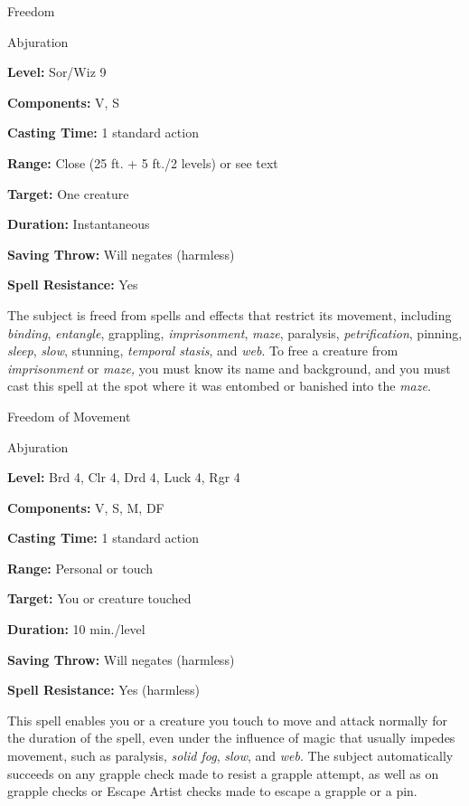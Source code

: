\documentclass{article}
\begin{document}
\vspace{12pt}
Freedom

Abjuration

\textbf{Level:} Sor/Wiz 9

\textbf{Components:} V, S

\textbf{Casting Time:} 1 standard action

\textbf{Range:} Close (25 ft. + 5 ft./2 levels) or see text

\textbf{Target:} One creature

\textbf{Duration:} Instantaneous

\textbf{Saving Throw: }Will negates (harmless)

\textbf{Spell Resistance:} Yes

The subject is freed from spells and effects that restrict its movement, including 
\textit{binding}, \textit{entangle}, grappling, \textit{imprisonment}, \textit{maze}, 
paralysis, \textit{petrification}, pinning, \textit{sleep}, \textit{slow}, stunning, 
\textit{temporal stasis}, and \textit{web}. To free a creature from \textit{imprisonment 
}or \textit{maze, }you must know its name and background, and you must cast this 
spell at the spot where it was entombed or banished into the \textit{maze}.

\vspace{12pt}
Freedom of Movement

Abjuration

\textbf{Level:} Brd 4, Clr 4, Drd 4, Luck 4, Rgr 4

\textbf{Components:} V, S, M, DF

\textbf{Casting Time:} 1 standard action

\textbf{Range:} Personal or touch

\textbf{Target:} You or creature touched

\textbf{Duration:} 10 min./level

\textbf{Saving Throw: }Will negates (harmless)

\textbf{Spell Resistance:} Yes (harmless)

This spell enables you or a creature you touch to move and attack normally for 
the duration of the spell, even under the influence of magic that usually impedes 
movement, such as paralysis, \textit{solid fog}, \textit{slow}, and \textit{web}. 
The subject automatically succeeds on any grapple check made to resist a grapple 
attempt, as well as on grapple checks or Escape Artist checks made to escape a 
grapple or a pin.
\end{document}
